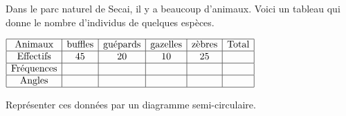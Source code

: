 \begin{exercice*}
    Dans le parc naturel de Secai, il y a beaucoup d'animaux.
    Voici un tableau qui donne le nombre d'individus de quelques espèces.
    
    \smallskip
    $\begin{array}{|c|c|c|c|c|c|}
    \hline
    \text{Animaux} & \text{buffles} & \text{guépards} & \text{gazelles} & \text{zèbres}& \text{Total}\\
    \hline
    \text{Effectifs} & 45 & 20 & 10 & 25 &\\
    \hline
    \text{Fréquences} &   &   &   &  &\\
    \hline
    \text{Angles} &   &   &   &  &\\
    \hline
    \end{array}$    
    
    \smallskip
    Représenter ces données par un diagramme semi-circulaire. 

\end{exercice*}

